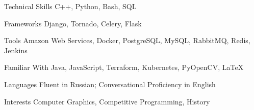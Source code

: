 

\begin{cvskills}
  \cvskill
    {Technical Skills} %
    {C++, Python, Bash, SQL} %

  \cvskill
    {Frameworks} %
    {Django, Tornado, Celery, Flask} %

  \cvskill
    {Tools} %
    {Amazon Web Services, Docker, PostgreSQL, MySQL, RabbitMQ, Redis, Jenkins} %

  \cvskill
    {Familiar With} %
    {Java, JavaScript, Terraform, Kubernetes, PyOpenCV, \LaTeX} %

  \cvskill
    {Languages} %
    {Fluent in Russian; Conversational Proficiency in English} %

  \cvskill
    {Interests} %
    {Computer Graphics, Competitive Programming, History} %


\end{cvskills}
